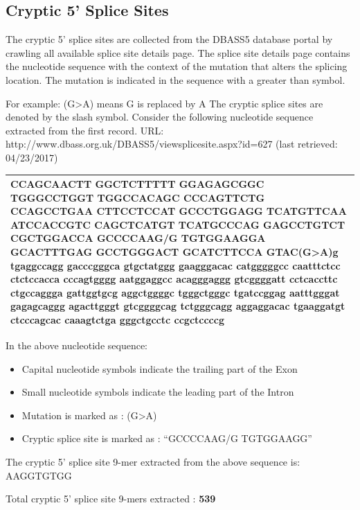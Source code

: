 \documentclass[12pt,a4paper]{article}
\begin{document}
	\subsection{Cryptic 5' Splice Sites}
	
	The cryptic 5’ splice sites are collected from the DBASS5 database portal \cite{dbass-0, dbass3} by crawling all available splice site details page. The splice site details page contains the nucleotide sequence with the context of the mutation that alters the splicing location. The mutation is indicated in the sequence with a greater than symbol. \par
	For example: (G>A) means G is replaced by A \newline
	The cryptic splice sites are denoted by the slash symbol. \newline
	Consider the following nucleotide sequence extracted from the first record.\newline
	URL: http://www.dbass.org.uk/DBASS5/viewsplicesite.aspx?id=627 (last retrieved: 04/23/2017)

		
	\begin{tabular}{ | p{\linewidth} |}
		\hline
		CCAGCAACTT GGCTCTTTTT GGAGAGCGGC TGGGCCTGGT TGGCCACAGC CCCAGTTCTG CCAGCCTGAA CTTCCTCCAT GCCCTGGAGG TCATGTTCAA ATCCACCGTC CAGCTCATGT TCATGCCCAG GAGCCTGTCT CGCTGGACCA GCCCCAA\textbf{G/G} TGTGGAAGGA GCACTTTGAG GCCTGGGACT GCATCTTCCA GTAC\textbf{(G>A)}g tgaggccagg gacccgggca gtgctatggg gaagggacac catgggggcc caatttctcc ctctccacca cccagtgggg aatggaggcc acagggaggg gtcggggatt cctcaccttc ctgccaggga gattggtgcg aggctggggc tgggctgggc tgatccggag aatttgggat gagagcaggg agacttgggt gtcggggcag tctgggcagg aggaggacac tgaaggatgt ctcccagcac caaagtctga gggctgcctc ccgctccccg \\
		\hline
	\end{tabular}
	\newline
	\newline
	In the above nucleotide sequence:
	\begin{itemize}
		\item Capital nucleotide symbols indicate the trailing part of the Exon
		\item Small nucleotide symbols indicate the leading part of the Intron
		\item Mutation is marked as : (G>A)
		\item Cryptic splice site is marked as : “GCCCCAAG/G TGTGGAAGG”
	\end{itemize}
	The cryptic 5’ splice site 9-mer extracted from the above sequence is: AAGGTGTGG \par
	Total cryptic 5’ splice site 9-mers extracted : \textbf{539}
\end{document}
